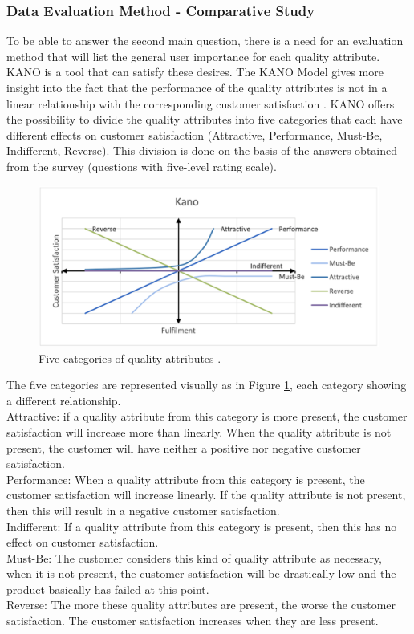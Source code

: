 \subsubsection{Data Evaluation Method - Comparative Study}
To be able to answer the second main question, there is a need for an evaluation method that will list the general user importance for each quality attribute. KANO is a tool that can satisfy these desires. The KANO Model gives more insight into the fact that the performance of the quality attributes is not in a linear relationship with the corresponding customer satisfaction \citep{KANO1984}. KANO offers the possibility to divide the quality attributes into five categories that each have different effects on customer satisfaction (Attractive, Performance, Must-Be, Indifferent, Reverse). This division is done on the basis of the answers obtained from the survey (questions with five-level rating scale).

\begin{figure}[ht]
	\includegraphics[scale=0.35]{../LaTeX/Figures/KANO.png}
	\caption{Five categories of quality attributes \citep{KANO1984}.}
	\label{fig:kano}
\end{figure}

The five categories are represented visually as in Figure \ref{fig:kano}, each category showing a different relationship.\\
\break
Attractive: if a quality attribute from this category is more present, the customer satisfaction will increase more than linearly. When the quality attribute is not present, the customer will have neither a positive nor negative customer satisfaction.\\
\break
Performance: When a quality attribute from this category is present, the customer satisfaction will increase linearly. If the quality attribute is not present, then this will result in a negative customer satisfaction.\\
\break
Indifferent: If a quality attribute from this category is present, then this has no effect on customer satisfaction.\\
\break
Must-Be: The customer considers this kind of quality attribute as necessary, when it is not present, the customer satisfaction will be drastically low and the product basically has failed at this point.\\
\break
Reverse: The more these quality attributes are present, the worse the customer satisfaction. The customer satisfaction increases when they are less present.


